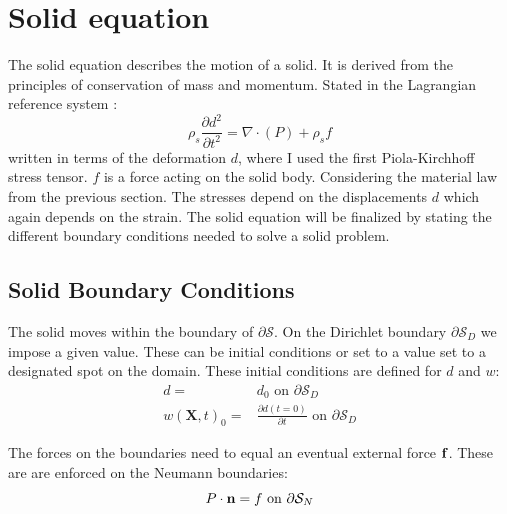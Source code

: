 \section{Solid equation}
The solid equation describes the motion of a solid. It is derived from the principles of conservation of mass and momentum. Stated in the Lagrangian reference system \cite{Richter2016}:
\begin{equation}\label{eq:Solid}
\rho_s \frac{\partial d^2}{\partial t^2} = \nabla \cdot ( P ) + \rho_s f 
\end{equation}
written in terms of the deformation $d$, where I used the first Piola-Kirchhoff stress tensor. $f$ is a force acting on the solid body. Considering the material law from the previous section. The stresses depend on the displacements $d$ which again depends on the strain. The solid equation will be finalized by stating the different boundary conditions needed to solve a solid problem.
\subsection{Solid Boundary Conditions}
The solid moves within the boundary of $ \partial \mathcal{S}$.  On the Dirichlet boundary $ \partial \mathcal{S}_D$ we impose a given value. These can be initial conditions or set to a value set to a designated spot on the domain. These initial conditions are defined for $d$ and $w$:
\begin{align}
d =& d_0 \text{ on   } \partial \mathcal{S}_D  \\
w(\textbf{X},t)_0 =& \frac{\partial d(t=0)}{\partial t} \text{   on   } \partial \mathcal{S}_D   
\end{align}

The forces on the boundaries need to equal an eventual external force $ \bold{f}$. These are are enforced on the Neumann boundaries:
$$ P\cdot \bold{n} = f \text{   on   } \partial \mathcal{S}_N    $$

